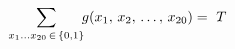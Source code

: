 \documentclass[preview]{standalone}
\begin{document}
\begin{align*}
\special{dvisvgm:raw <g id='unique000'>}\sum_{x_1\ldots x_{20}\,\in\,\{0,1\}}\!\! g(x_1,\,x_2,\,\ldots,\,x_{20})=\  \special{dvisvgm:raw </g>}\special{dvisvgm:raw <g id='unique001'>}T\special{dvisvgm:raw </g>}
\end{align*}
\end{document}
